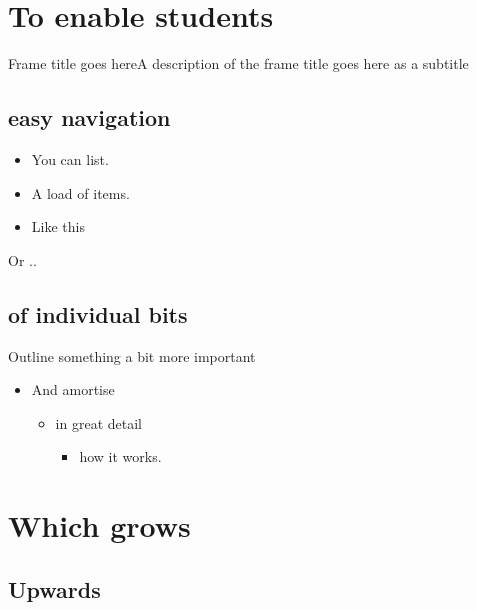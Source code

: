 \documentclass[]{beamer}
\begin{document}
\section{To enable students}
\begin{frame}[t]{Frame title goes here}{A description of the frame title goes here as a subtitle}
  \subsection{easy navigation}
  \begin{itemize}
    \item You can list.
    \item A load of items.
    \item Like this
  \end{itemize}
  Or ..
  \subsection{of individual bits}
  \begin{alertblock}{Outline something a bit more important}
    \begin{itemize}
      \item And amortise
            \begin{itemize}
              \item in great detail
                    \begin{itemize}
                      \item how it works.
                    \end{itemize}
            \end{itemize}
    \end{itemize}
  \end{alertblock}
  \section{Which grows}
  \subsection{Upwards}
\end{frame}
\end{document}
